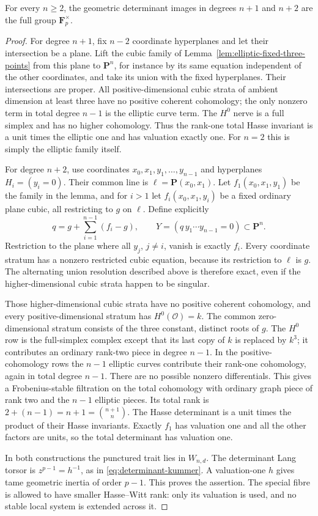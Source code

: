 \begin{proposition}\label{prop:pn-seed-full-determinant}
For every $n\geq2$, the geometric determinant images in degrees
$n+1$ and $n+2$ are the full group $\mathbf F_p^\times$.
\end{proposition}

\begin{proof}
For degree $n+1$, fix $n-2$ coordinate hyperplanes and let their
intersection be a plane.  Lift the cubic family of
Lemma~\ref{lem:elliptic-fixed-three-points} from this plane to
$\mathbf P^n$, for instance by its same equation independent
of the other coordinates, and take its union with the fixed
hyperplanes.  Their intersections are proper.  All
positive-dimensional cubic strata of ambient dimension at
least three have no positive coherent cohomology; the only
nonzero term in total degree $n-1$ is the elliptic curve term.
The $H^0$ nerve is a full simplex and has no higher cohomology.
Thus the rank-one total Hasse invariant is a unit times the
elliptic one and has valuation exactly one.
For $n=2$ this is simply the elliptic family itself.

For degree $n+2$, use coordinates
$x_0,x_1,y_1,\ldots,y_{n-1}$ and hyperplanes $H_i=(y_i=0)$.
Their common line is $\ell=\mathbf P(x_0,x_1)$.
Let $f_1(x_0,x_1,y_1)$ be the family in the lemma, and for
$i>1$ let $f_i(x_0,x_1,y_i)$ be a fixed ordinary plane cubic,
all restricting to $g$ on $\ell$.  Define explicitly
\[
 q=g+\sum_{i=1}^{n-1}(f_i-g),\qquad
 Y=(q\,y_1\cdots y_{n-1}=0)\subset\mathbf P^n.
 \tag{3}
\]
Restriction to the plane where all $y_j$, $j\ne i$, vanish
is exactly $f_i$.  Every coordinate stratum has a nonzero
restricted cubic equation, because its restriction to $\ell$
is $g$.  The alternating union resolution described above
is therefore exact, even if the higher-dimensional cubic
strata happen to be singular.

Those higher-dimensional cubic strata have no positive
coherent cohomology, and every positive-dimensional stratum
has $H^0(\mathcal O)=k$.  The common zero-dimensional stratum
consists of the three constant, distinct roots of $g$.
The $H^0$ row is the full-simplex complex except that its last
copy of $k$ is replaced by $k^3$; it contributes an ordinary
rank-two piece in degree $n-1$.  In the positive-cohomology
rows the $n-1$ elliptic curves contribute their rank-one
cohomology, again in total degree $n-1$.  There are no
possible nonzero differentials.  This gives a Frobenius-stable
filtration on the total cohomology with ordinary graph piece
of rank two and the $n-1$ elliptic pieces.  Its total rank is
$2+(n-1)=n+1=\binom{n+1}{n}$.
The Hasse determinant is a unit times the product of their
Hasse invariants.  Exactly $f_1$ has valuation one and all the
other factors are units, so the total determinant has
valuation one.

In both constructions the punctured trait lies in $W_{n,d}$.
The determinant Lang torsor is
$z^{p-1}=h^{-1}$, as in \eqref{eq:determinant-kummer}.
A valuation-one $h$ gives tame geometric inertia of order
$p-1$.  This proves the assertion.  The special fibre is
allowed to have smaller Hasse--Witt rank: only its valuation
is used, and no stable local system is extended across it.
\end{proof}

